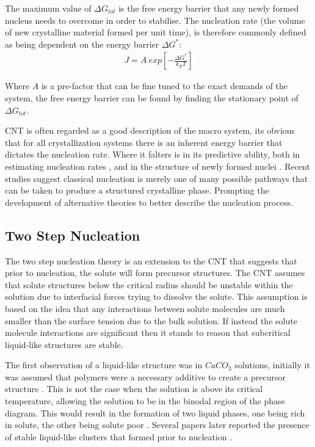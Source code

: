 The maximum value of $\Delta G_{tot}$ is the free energy barrier 
that any newly formed nucleus needs to overcome in order to stabilise. 
The nucleation rate (the volume of new crystalline material formed per 
unit time), is therefore commonly defined as being dependent on the 
energy barrier $\Delta G^*$:
\begin{align}
	J = A \ exp \left[-\frac{\Delta G^*}{k_BT} \right]
\end{align}

Where $A$ is a pre-factor that can be fine tuned to the exact 
demands of the system, the free energy barrier can be found by finding 
the stationary point of $\Delta G_{tot}$. 

CNT is often regarded as a good description of the macro system, its 
obvious that for all crystallization systems there is an inherent energy 
barrier that dictates the nucleation rate. Where it falters is in its 
predictive ability, both in estimating nucleation rates \cite{Gharibeh2005, 
Vekilov2010}, and in the structure of newly formed nuclei \cite{Lee1999, 
Yau2001}. Recent studies suggest classical nucleation is merely one of many 
possible pathways that can be taken to produce a structured crystalline phase. 
Prompting the development of alternative theories to better describe the 
nucleation process.

\subsection{Two Step Nucleation}
The two step nucleation theory is an extension to the CNT 
that suggests that prior to nucleation, the solute will 
form precursor structures. The CNT assumes that solute 
structures below the critical radius should be unstable 
within the solution due to interfacial forces trying to 
dissolve the solute. This assumption is based on the idea 
that any interactions between solute molecules are much
smaller than the surface tension due to the bulk solution.
If instead the solute molecule interactions are significant
then it stands to reason that subcritical liquid-like 
structures are stable. 

The first observation of a liquid-like structure was in 
$CaCO_3$ solutions, initially it was assumed that polymers
were a necessary additive to create a precursor structure 
\cite{Driessche2017, Karthika2016}. This is not the case when 
the solution is above its critical temperature, allowing the 
solution to be in the binodal region of the phase diagram. 
This would result in the formation of two liquid phases, 
one being rich in solute, the other being solute poor 
\cite{Karthika2016, Fu2021}. Several papers later reported 
the presence of stable liquid-like clusters that formed 
prior to nucleation \cite{Savage2009, Wolde1997, Soga1999}. 

